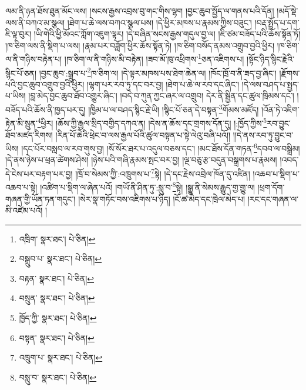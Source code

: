 ལམ་ནི་ཉན་ཐོས་ཐུན་མོང་ལས། །སངས་རྒྱས་འབྲས་བུ་གང་གིས་ལྷག །བྱང་ཆུབ་སྤྱོད་ལ་གནས་པའི་དོན། །མདོ་སྡེ་ལས་ནི་བཀའ་མ་སྩལ། །ཐེག་པ་ཆེ་ལས་བཀའ་སྩལ་པས། །དེ་ཕྱིར་མཁས་པ་རྣམས་ཀྱིས་བཟུང་། །བརྡ་སྤྲོད་པ་དག་ཇི་ལྟ་བུར། །ཡི་གེའི་ཕྱི་མོའང་ཀློག་འཇུག་ལྟར། །དེ་བཞིན་སངས་རྒྱས་གདུལ་བྱ་ལ། །ཇི་ཙམ་བཟོད་པའི་ཆོས་སྟོན་ཏོ། །ཁ་ཅིག་ལས་ནི་སྡིག་པ་ལས། །རྣམ་པར་བཟློག་ཕྱིར་ཆོས་སྟོན་ཏེ། །ཁ་ཅིག་བསོད་ནམས་འགྲུབ་བྱའི་ཕྱིར། །ཁ་ཅིག་ལ་ནི་གཉིས་བརྟེན་པ། །ཁ་ཅིག་ལ་ནི་གཉིས་མི་བརྟེན། །ཟབ་མོ་ཁུ་འཕྲིགས་\footnote{འཁྲིག་  སྣར་ཐང་།  པེ་ཅིན། }ཅན་འཇིགས་པ། །སྟོང་ཉིད་སྙིང་རྗེའི་སྙིང་པོ་ཅན། །བྱང་ཆུབ་:སྒྲུབ་པ་\footnote{བསྒྲུབ་པ་  སྣར་ཐང་།  པེ་ཅིན། }ཁ་ཅིག་ལ། །དེ་ལྟར་མཁས་པས་ཐེག་ཆེན་ལ། །ཁོང་ཁྲོ་བ་ནི་ཟད་བྱ་ཞིང་། །རྫོགས་པའི་བྱང་ཆུབ་འགྲུབ་བྱའི་ཕྱིར། །ལྷག་པར་རབ་ཏུ་དང་བར་བྱ། །ཐེག་པ་ཆེ་ལ་རབ་དང་ཞིང་། །དེ་ལས་བཤད་པ་སྤྱད་པ་ཡིས། །བླ་མེད་བྱང་ཆུབ་ཐོབ་འགྱུར་ཞིང་། །བདེ་བ་ཀུན་ཀྱང་ཞར་ལ་འགྲུབ། དེར་ནི་སྦྱིན་དང་ཚུལ་ཁྲིམས་དང་། །བཟོད་པའི་ཆོས་ནི་ཁྱད་པར་དུ། །ཁྱིམ་པ་ལ་བཤད་སྙིང་རྗེ་ཡི། །སྙིང་པོ་ཅན་དེ་བསྟན་\footnote{བརྟན་  སྣར་ཐང་།  པེ་ཅིན། }གོམས་མཛོད། །འོན་ཏེ་འཇིག་རྟེན་མི་སྲུན་\footnote{བསྲུན་  སྣར་ཐང་།  པེ་ཅིན། }ཕྱིར། །ཆོས་ཀྱི་རྒྱལ་སྲིད་བགྱིད་དཀའ་ན། །དེས་ན་ཆོས་དང་གྲགས་དོན་དུ། །:ཁྱོད་ཀྱིས་\footnote{ཁྱོད་ཀྱི་  སྣར་ཐང་།  པེ་ཅིན། }རབ་བྱུང་ཐོབ་མཛད་རིགས། །རིན་པོ་ཆེའི་ཕྲེང་བ་ལས་རྒྱལ་པོའི་ཚུལ་བསྟན་པ་སྟེ་ལེའུ་བཞི་པའོ།། །།དེ་ནས་རབ་ཏུ་བྱུང་བ་ཡིས། །དང་པོར་བསླབ་ལ་རབ་གུས་བྱ། །སོ་སོར་ཐར་པ་འདུལ་བཅས་དང་། །མང་ཐོས་དོན་གཏན་\footnote{བསྟན་  སྣར་ཐང་།  པེ་ཅིན། }དབབ་ལ་བསྒྲིམ། །དེ་ནས་ཉེས་པ་ཕྲན་ཚེགས་ཤེས། །ཉེས་པའི་གཞི་རྣམས་སྤང་བར་བྱ། །ལྔ་བཅུ་རྩ་བདུན་བསྒྲགས་པ་རྣམས། །འབད་དེ་ངེས་པར་བརྟག་པར་བྱ། །ཁྲོ་བ་སེམས་ཀྱི་:འཁྲུགས་པ་\footnote{འཁྲུག་པ་  སྣར་ཐང་།  པེ་ཅིན། }སྟེ། །དེ་དང་རྗེས་འབྲེལ་ཁོན་དུ་འཛིན། །འཆབ་པ་སྡིག་པ་འཆབ་པ་སྟེ། །འཚིག་པ་སྡིག་ལ་ཞེན་པའོ། །གཡོ་ནི་ཤིན་ཏུ་:སླུ་བ་\footnote{བསླུ་བ་  སྣར་ཐང་།  པེ་ཅིན། }སྟེ། །སྒྱུ་ནི་སེམས་རྒྱུད་གྱ་གྱུ་ལ། །ཕྲག་དོག་གཞན་གྱི་ཡོན་ཏན་གདུང་། །སེར་སྣ་གཏོང་བས་འཇིགས་པ་ཉིད། །ངོ་ཚ་མེད་དང་ཁྲེལ་མེད་པ། །རང་དང་གཞན་ལ་མི་འཛེམ་པའོ། །
